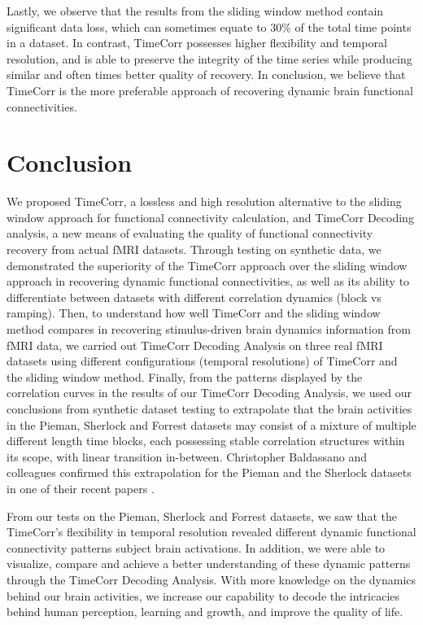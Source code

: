 \documentclass[11pt]{article}
\begin{document}
Lastly, we observe that the results from the sliding window method contain significant data loss, which can sometimes equate to $30\%$ of the total time points in a dataset. In contrast, TimeCorr possesses higher flexibility and temporal resolution, and is able to preserve the integrity of the time series while producing similar and often times better quality of recovery. In conclusion, we believe that TimeCorr is the more preferable approach of recovering dynamic brain functional connectivities.


\clearpage
\newpage
\section{Conclusion}
We proposed TimeCorr, a lossless and high resolution alternative to the sliding window approach for functional connectivity calculation, and TimeCorr Decoding analysis, a new means of evaluating the quality of functional connectivity recovery from actual fMRI datasets. Through testing on synthetic data, we demonstrated the superiority of the TimeCorr approach over the sliding window approach in recovering dynamic functional connectivities, as well as its ability to differentiate between datasets with different correlation dynamics (block vs ramping). Then, to understand how well TimeCorr and the sliding window method compares in recovering stimulus-driven brain dynamics information from fMRI data, we carried out TimeCorr Decoding Analysis on three real fMRI datasets using different configurations (temporal resolutions) of TimeCorr and the sliding window method. Finally, from the patterns displayed by the correlation curves in the results of our TimeCorr Decoding Analysis, we used our conclusions from synthetic dataset testing to extrapolate that the brain activities in the Pieman, Sherlock and Forrest datasets may consist of a mixture of multiple different length time blocks, each possessing stable correlation structures within its scope, with linear transition in-between. Christopher Baldassano and colleagues confirmed this extrapolation for the Pieman and the Sherlock datasets in one of their recent papers \citep{Baldassano2016}.

From our tests on the Pieman, Sherlock and Forrest datasets, we saw that the TimeCorr's flexibility in temporal resolution revealed different dynamic functional connectivity patterns subject brain activations. In addition, we were able to visualize, compare and achieve a better understanding of these dynamic patterns through the TimeCorr Decoding Analysis. With more knowledge on the dynamics behind our brain activities, we increase our capability to decode the intricacies behind human perception, learning and growth, and improve the quality of life.
\end{document}
